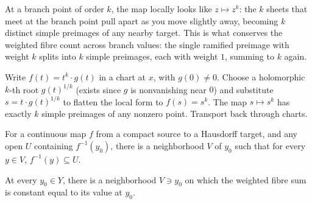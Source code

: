 \begin{layman}
At a branch point of order \(k\), the map locally looks like
\(z\mapsto z^k\): the \(k\) sheets that meet at the branch point pull
apart as you move slightly away, becoming \(k\) distinct simple
preimages of any nearby target. This is what conserves the weighted
fibre count across branch values: the single ramified preimage with
weight \(k\) splits into \(k\) simple preimages, each with weight
\(1\), summing to \(k\) again.
\end{layman}

\begin{proofsketch}
Write \(f(t)=t^k\cdot g(t)\) in a chart at \(x\), with \(g(0)\ne 0\).
Choose a holomorphic \(k\)-th root \(g(t)^{1/k}\) (exists since \(g\)
is nonvanishing near \(0\)) and substitute \(s=t\cdot g(t)^{1/k}\) to
flatten the local form to \(f(s)=s^k\). The map \(s\mapsto s^k\) has
exactly \(k\) simple preimages of any nonzero point. Transport back
through charts.
\end{proofsketch}

\begin{lemma}
\label{lem:proper-fiber-shrink}
For a continuous map \(f\) from a compact source to a Hausdorff
target, and any open \(U\) containing \(f^{-1}(y_0)\), there is a
neighborhood \(V\) of \(y_0\) such that for every \(y\in V\),
\(f^{-1}(y)\subseteq U\).
\leanok
\end{lemma}

\begin{lemma}
\label{lem:weighted-fiber-eventually-eq}
At every \(y_0\in Y\), there is a neighborhood \(V\ni y_0\) on which
the weighted fibre sum is constant equal to its value at \(y_0\).
\notready
\end{lemma}

